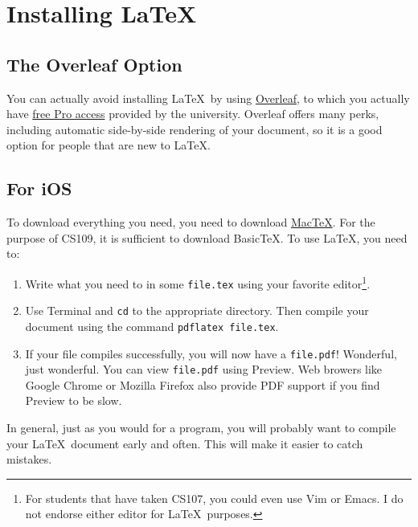 \documentclass[11pt]{article}
\begin{document}
\newpage

\section*{Installing \LaTeX}
\subsection*{The Overleaf Option}
You can actually avoid installing \LaTeX\ by using \href{https://www.overleaf.com/}{Overleaf}, to which you actually have \href{https://www.overleaf.com/edu/stanford}{free Pro access} provided by the university. 
Overleaf offers many perks, including automatic side-by-side rendering of your document, so it is a good option for people that are new to \LaTeX.

\subsection*{For iOS}
To download everything you need, you need to download \href{http://www.tug.org/mactex/morepackages.html}{MacTeX}. For the purpose of CS109, it is sufficient to download BasicTeX. To use \LaTeX, you need to:
\begin{enumerate}
\item Write what you need to in some \texttt{file.tex} using your favorite editor\footnote{For students that have taken CS107, you could even use Vim or Emacs. I do not endorse either editor for \LaTeX\ purposes.}.

\item Use Terminal and \texttt{cd} to the appropriate directory. Then compile your document using the command \texttt{pdflatex file.tex}.

\item If your file compiles successfully, you will now have a \texttt{file.pdf}! Wonderful, just wonderful. You can view \texttt{file.pdf} using Preview. Web browers like Google Chrome or Mozilla Firefox also provide PDF support if you find Preview to be slow.
\end{enumerate}

In general, just as you would for a program, you will probably want to compile your \LaTeX\ document early and often.
This will make it easier to catch mistakes.
\end{document}
